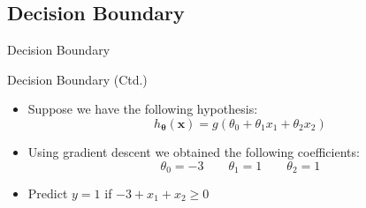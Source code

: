 \subsection{Decision Boundary}

\begin{frame}{Decision Boundary}{}
\end{frame}


\begin{frame}{Decision Boundary (Ctd.)}{}
	\begin{itemize}
		\item Suppose we have the following hypothesis:
		\begin{equation*}
			h_{\bm{\theta}}(\bm{x}) = g(\theta_0 + \theta_1 x_1 + \theta_2 x_2)
		\end{equation*}
		\item Using gradient descent we obtained the following coefficients:
		\begin{equation*}
			\theta_0 = -3 \qquad \theta_1 = 1 \qquad \theta_2 = 1
		\end{equation*}
		\item Predict $y = 1$ if $-3 + x_1 + x_2 \ge 0$
	\end{itemize}
\end{frame}


